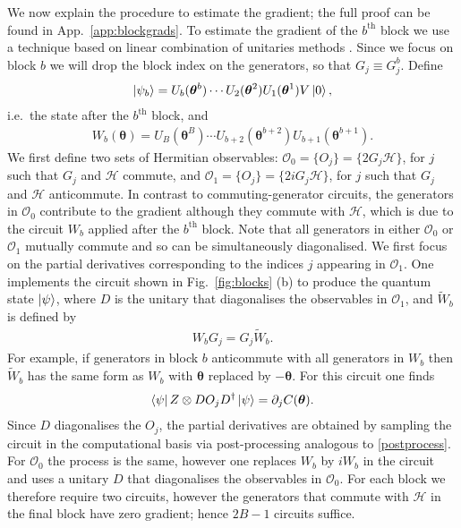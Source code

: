 \documentclass[a4paper,twocolumn,11pt,accepted=2025-09-06]{quantumarticle}
\renewcommand{\vec}{\boldsymbol}
\begin{document}
We now explain the procedure to estimate the gradient; the full proof can be found in App.\ \ref{app:blockgrads}. To estimate the gradient of the $b^{\text{th}}$ block we use a technique based on linear combination of unitaries methods \cite{childs2012hamiltonian}. Since we focus on block $b$ we will drop the block index on the generators, so that $G_j\equiv G_j^b$. Define 
\begin{align}
\ket{\psi_b}=U_b(\vec{\theta}^b)\cdots U_2(\vec{\theta}^2)U_1(\vec{\theta}^1)V\ket{0},   
\end{align}
i.e.\ the state after the $b^{\text{th}}$ block, and 
\begin{align}\label{Wbdef}
    W_b(\vec{\theta}) = U_B(\vec{\theta}^B)\cdots U_{b+2}(\vec{\theta}^{b+2})U_{b+1}(\vec{\theta}^{b+1}).
\end{align}
We first define two sets of Hermitian observables: $\mathcal{O}_0 = \{O_j\} = \{2G_j\mathcal{H}\}$, for $j$ such that $G_j$ and $\mathcal{H}$ commute, and $\mathcal{O}_1 = \{O_j\} = \{2iG_j\mathcal{H}\}$, for $j$ such that $G_j$ and $\mathcal{H}$ anticommute.
In contrast to commuting-generator circuits, the generators in $\mathcal{O}_0$ contribute to the gradient although they commute with $\mathcal{H}$, which is due to the circuit $W_b$ applied after the $b^{\text{th}}$ block.
Note that all generators in either $\mathcal{O}_0$ or $\mathcal{O}_1$ mutually commute and so can be simultaneously diagonalised. We first focus on the partial derivatives corresponding to the indices $j$ appearing in $\mathcal{O}_1$. One implements the circuit shown in Fig.\ \ref{fig:blocks} (b) to produce the quantum state $\ket{\psi}$, where $D$ is the unitary that diagonalises the observables in $\mathcal{O}_1$, and $\tilde{W}_b$ is defined by 
\begin{align}\label{Wbtildedef}
    W_bG_j = G_j\tilde{W}_b.
\end{align}
For example, if generators in block $b$ anticommute with all generators in $W_b$ then $\tilde{W}_b$ has the same form as $W_b$ with $\vec{\theta}$ replaced by $-\vec{\theta}$. 
For this circuit one finds 
\begin{align}
    \bra{\psi} Z\otimes DO_jD^\dagger\ket{\psi}=\partial_j C(\vec{\theta}).
\end{align}
Since $D$ diagonalises the $O_j$, the partial derivatives are obtained by sampling the circuit in the computational basis via post-processing analogous to \eqref{postprocess}. For $\mathcal{O}_0$ the process is the same, however one replaces $W_b$ by $iW_b$ in the circuit and uses a unitary $D$ that diagonalises the observables in $\mathcal{O}_0$. For each block we therefore require two circuits, however the generators that commute with $\mathcal{H}$ in the final block have zero gradient; hence $2B-1$ circuits suffice. 
\end{document}
